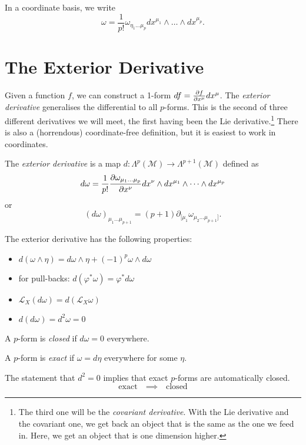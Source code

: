 In a coordinate basis, we write
\begin{equation}
  \omega = \frac{1}{p!} \omega_{\eta_1 \dots \mu_p} dx^{\mu_1} \wedge \dots \wedge dx^{\mu_p}.
\end{equation}

\section{The Exterior Derivative}%
\label{sec:the_exterior_derivative}

Given a function $f$, we can construct a 1-form $ df = \pdv{f}{x^\mu} dx^\mu$.
The \emph{exterior derivative} generalises the differential to all $p$-forms. This is the second of three different derivatives we will meet, the first having been the Lie derivative.\footnote{The third one will be the \emph{covariant derivative}. With the Lie derivative and the covariant one, we get back an object that is the same as the one we feed in. Here, we get an object that is one dimension higher.}
There is also a (horrendous) coordinate-free definition, but it is easiest to work in coordinates.

\begin{definition}[]
  The \emph{exterior derivative} is a map $d: \Lambda^p(\mathcal{M}) \to \Lambda^{p+1}(\mathcal{M})$ defined as
  \begin{equation}
    d\omega = \frac{1}{p!} \pdv{\omega_{\mu_1 \dots \mu_p}}{x^\nu} dx^\nu \wedge dx^{\mu_1} \wedge \dots \wedge dx^{\mu_p}
  \end{equation}
  or
  \begin{equation}
    (d\omega)_{\mu_1 \dots \mu_{p+1}} = (p+1) \partial_{[\mu_1} \omega_{\mu_2 \dots \mu_{p+1}]}.
  \end{equation}
\end{definition}
\begin{claim}
  The exterior derivative has the following properties:
  \begin{itemize}
    \item $d(\omega \wedge\eta) = d\omega \wedge \eta + (-1)^p \omega \wedge d \omega$
    \item for pull-backs: $d(\varphi^* \omega) = \varphi^* d\omega$
    \item $\mathcal{L}_X (d\omega) = d(\mathcal{L}_X \omega)$
    \item $d(d\omega) = d^2 \omega = 0$
  \end{itemize}
\end{claim}
\begin{definition}[]
  A $p$-form is \emph{closed} if $d\omega =0$ everywhere.
\end{definition}
\begin{definition}[]
  A $p$-form is \emph{exact} if $\omega = d\eta$ everywhere for some $\eta$.
\end{definition}
\begin{corollary}
  The statement that $d^2 = 0$ implies that exact $p$-forms are automatically closed.
  \begin{equation}
    \text{exact} \quad \implies \quad \text{closed}
  \end{equation}
\end{corollary}

